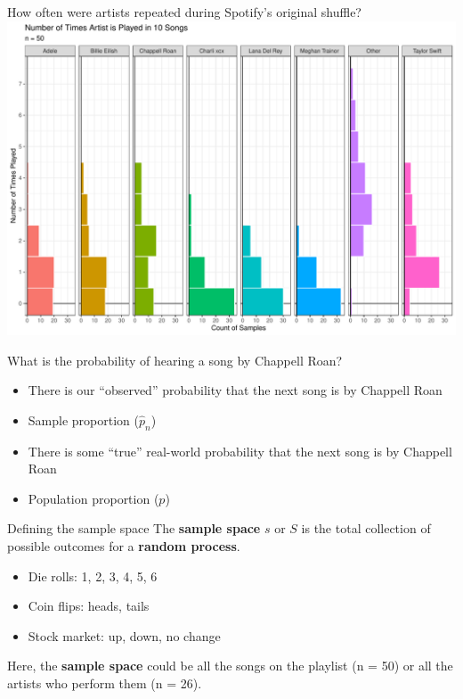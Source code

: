 \documentclass[
  ignorenonframetext,
]{beamer}
\begin{document}
\begin{frame}{How often were artists repeated during Spotify's original
shuffle?}
\label{how-often-were-artists-repeated-during-spotifys-original-shuffle}
\includegraphics{class09_files/figure-beamer/unnamed-chunk-3-1.pdf}
\end{frame}

\begin{frame}{What is the probability of hearing a song by Chappell
Roan?}
\label{what-is-the-probability-of-hearing-a-song-by-chappell-roan}
\begin{itemize}
\item
  There is our ``observed'' probability that the next song is by
  Chappell Roan
\item
  Sample proportion (\(\hat{p}_n\))
\item
  There is some ``true'' real-world probability that the next song is by
  Chappell Roan
\item
  Population proportion (\(p\))
\end{itemize}
\end{frame}

\begin{frame}{Defining the sample space}
\label{defining-the-sample-space}
The \textbf{sample space} \(s\) or \(S\) is the total collection of
possible outcomes for a \textbf{random process}.

\begin{itemize}
\item
  Die rolls: 1, 2, 3, 4, 5, 6
\item
  Coin flips: heads, tails
\item
  Stock market: up, down, no change
\end{itemize}

Here, the \textbf{sample space} could be all the songs on the playlist
(n = 50) or all the artists who perform them (n = 26).
\end{frame}
\end{document}
